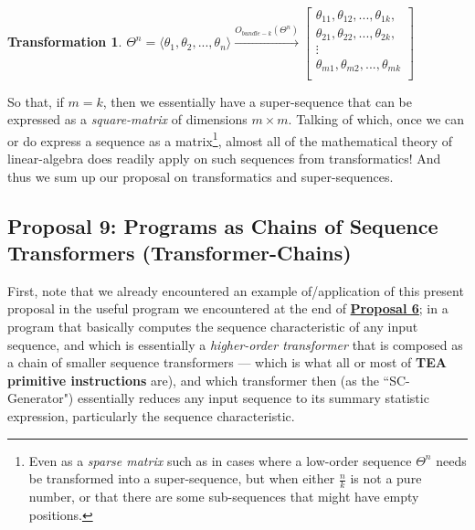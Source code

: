 \documentclass[a4paper, 18pt]{book} %
\newtheorem{trans}{Transformation}
\begin{document}
\begin{appendices}
\vspace{2em}
\begin{trans}
$\Theta^n = \langle \theta_1, \theta_2, ..., \theta_n \rangle \xrightarrow{O_{bundle-k}(\Theta^n)}
 \begin{bmatrix}
 \theta_{11}, \theta_{12} ,..., \theta_{1k},\\
   \theta_{21}, \theta_{22} ,... , \theta_{2k},\\
   \vdots \\
     \theta_{m1}, \theta_{m2} ,..., \theta_{mk}\\
 \end{bmatrix}$
\end{trans}
\vspace{2em}

So that, if $m=k$, then we essentially have a super-sequence that can be expressed as a \textit{square-matrix} of dimensions $m \times m$. Talking of which, once we can or do express a sequence as a matrix\footnote{Even as a \textit{sparse matrix} such as in cases where a low-order sequence $\Theta^n$ needs be transformed into a super-sequence, but when either $\frac{n}{k}$ is not a pure number, or that there are some sub-sequences that might have empty positions.}, almost all of the mathematical theory of linear-algebra does readily apply on such sequences from transformatics! And thus we sum up our proposal on transformatics and super-sequences.

\subsection{Proposal 9: Programs as Chains of Sequence Transformers (Transformer-Chains)\cite{lutalo_2025_trans_genetics}\cite{cli_tttt}}
\label{PROP9}

First, note that we already encountered an example of/application of this present proposal in the useful program we encountered at the end of \textbf{\hyperref[PROP6]{Proposal 6}}; in a program that basically computes the sequence characteristic of any input sequence, and which is essentially a \textit{higher-order transformer} that is composed as a chain of smaller sequence transformers  --- which is what all or most of \textbf{TEA primitive instructions}\cite{Lutalo2024TEATAZ} are), and which transformer then (as the ``SC-Generator") essentially reduces any input sequence to its summary statistic expression, particularly the sequence characteristic.\\


\end{appendices}
\end{document}
